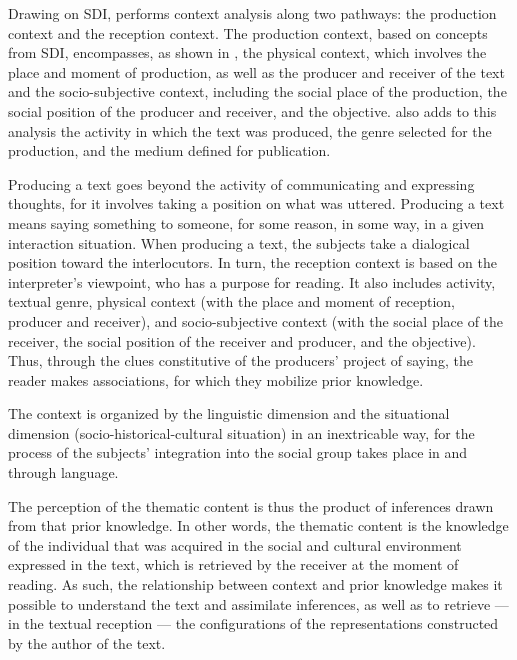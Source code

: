\documentclass[english]{textolivre}
\begin{document}
Drawing on SDI, \textcite{leal2011organizaccao} performs context analysis along two pathways: the production context and the reception context. The production context, based on concepts from SDI, encompasses, as shown in , the physical context, which involves the place and moment of production, as well as the producer and receiver of the text and the socio-subjective context, including the social place of the production, the social position of the producer and receiver, and the objective. \textcite{leal2011organizaccao} also adds to this analysis the activity in which the text was produced, the genre selected for the production, and the medium defined for publication. 

Producing a text goes beyond the activity of communicating and expressing thoughts, for it involves taking a position on what was uttered. Producing a text means saying something to someone, for some reason, in some way, in a given interaction situation. When producing a text, the subjects take a dialogical position toward the interlocutors. In turn, the reception context is based on the interpreter’s viewpoint, who has a purpose for reading. It also includes activity, textual genre, physical context (with the place and moment of reception, producer and receiver), and socio-subjective context (with the social place of the receiver, the social position of the receiver and producer, and the objective). Thus, through the clues constitutive of the producers’ project of saying, the reader makes associations, for which they mobilize prior knowledge. 

The context is organized by the linguistic dimension and the situational dimension (socio-historical-cultural situation) in an inextricable way, for the process of the subjects’ integration into the social group takes place in and through language. 

The perception of the thematic content is thus the product of inferences drawn from that prior knowledge. In other words, the thematic content is the knowledge of the individual that was acquired in the social and cultural environment expressed in the text, which is retrieved by the receiver at the moment of reading. As such, the relationship between context and prior knowledge makes it possible to understand the text and assimilate inferences, as well as to retrieve — in the textual reception — the configurations of the representations constructed by the author of the text. 
\end{document}
